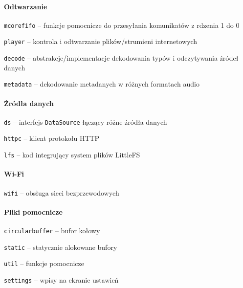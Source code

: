 \documentclass[polish]{aghengthesis}
\let\tempone\itemize
\let\temptwo\enditemize
\renewenvironment{itemize}{\tempone\setlength{\itemsep}{0cm}}{\temptwo}
\begin{document}
			\paragraph{Odtwarzanie}
				\begin{itemize}
					\item \lstinline|mcorefifo| -- funkcje pomocnicze do przesyłania komunikatów z rdzenia 1 do 0
					\item \lstinline|player| -- kontrola i odtwarzanie plików/strumieni internetowych
					\begin{itemize}
						\item \lstinline|decode| -- abstrakcje/implementacje dekodowania typów i odczytywania źródeł danych
						\item \lstinline|metadata| -- dekodowanie metadanych w różnych formatach audio
					\end{itemize}
				\end{itemize}
		
			\paragraph{Źródła danych}
				\begin{itemize}
					\item \lstinline|ds| -- interfejs \lstinline|DataSource| łączący różne źródła danych
					\item \lstinline|httpc| -- klient protokołu HTTP
					\item \lstinline|lfs| -- kod integrujący system plików LittleFS\textsuperscript{\cite{littlefs}}
				\end{itemize}
			
			\paragraph{Wi-Fi}
				\begin{itemize}
					\item \lstinline|wifi| -- obsługa sieci bezprzewodowych
				\end{itemize}
		
			\paragraph{Pliki pomocnicze}
				\begin{itemize}
					\item \lstinline|circularbuffer| -- bufor kołowy
					\item \lstinline|static| -- statycznie alokowane bufory
					\item \lstinline|util| -- funkcje pomocnicze
					\item \lstinline|settings| -- wpisy na ekranie ustawień
				\end{itemize}
	
\end{document}
